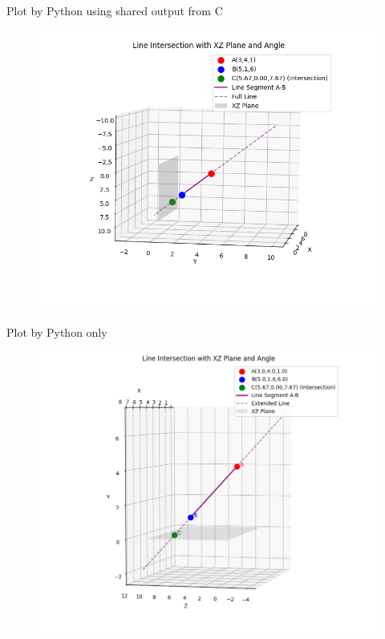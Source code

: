 \documentclass{beamer}
\begin{document}
\begin{frame}{Plot by Python using shared output from C}
\begin{figure}[H]
\centering
\includegraphics[width=0.8\columnwidth]{../figs/fig1.png}
\caption{}
\label{fig:1}
\end{figure}
\end{frame}
\begin{frame}{Plot by Python only}
\begin{figure}[H]
\centering
\includegraphics[width=0.8\columnwidth]{../figs/fig2.png}
\caption{}
\label{fig:2}
\end{figure}
\end{frame}
\end{document}
